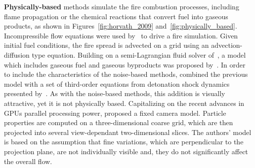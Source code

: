\textbf{Physically-based} methods simulate the fire combustion processes, including flame propagation or the chemical reactions that convert fuel into gaseous products, as shown in Figures~\ref{fig:horvath_2009} and~\ref{fig:physically_based}.  
Incompressible flow equations were used by~\cite{Stam:1995} to drive a fire simulation.
Given initial fuel conditions, the fire spread is advected on a grid using an advection-diffusion type equation.
Building on a semi-Lagrangian fluid solver of~\cite{Stam:1999}, a model which includes gaseous fuel and gaseous byproducts was proposed by~\cite{Nguyen:2002}.
In order to include the characteristics of the noise-based methods, \cite{Hong:2007} combined the previous model with a set of third-order equations from detonation shock dynamics presented by~\cite{Yao:1996}.
As with the noise-based methods, this addition is visually attractive, yet it is not physically based. 
Capitalizing on the recent advances in GPUs parallel processing power, \cite{Horvath:2009} proposed a fixed camera model.
Particle properties are computed on a three-dimensional coarse grid, which are then projected into several view-dependant two-dimensional slices.
The authors' model is based on the assumption that fine variations, which are perpendicular to the projection plane, are not individually visible and, they do not significantly affect the overall flow.


